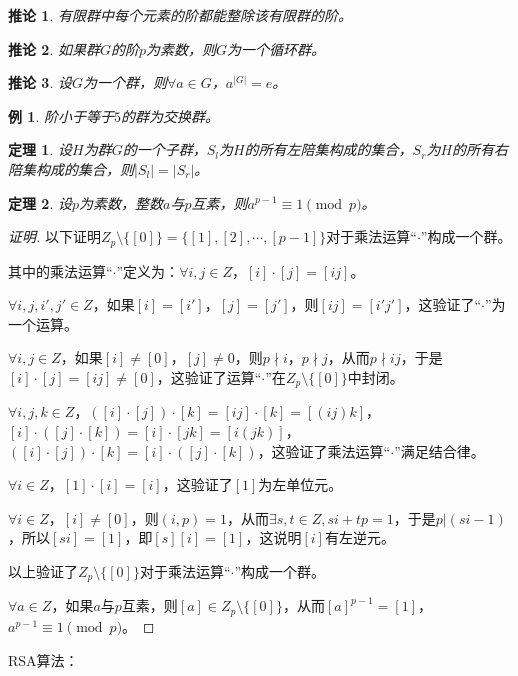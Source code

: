 \documentclass{article}
\newtheorem{Thm}{定理}
\newtheorem*{Example}{例}
\newtheorem{Cor}{推论}
\begin{document}
\begin{CJK*}{UTF8}{gbsn}
\begin{Cor}
有限群中每个元素的阶都能整除该有限群的阶。
\end{Cor}

\begin{Cor}
  如果群$G$的阶$p$为素数，则$G$为一个循环群。
\end{Cor}

\begin{Cor}
  设$G$为一个群，则$\forall a\in G$，$a^{|G|}=e$。
\end{Cor}

\begin{Example}
  阶小于等于$5$的群为交换群。
\end{Example}

\begin{Thm}
  设$H$为群$G$的一个子群，$S_l$为$H$的所有左陪集构成的集合，$S_r$为$H$的所有右陪集构成的集合，则$|S_l|=|S_r|$。
\end{Thm}

\begin{Thm}
  设$p$为素数，整数$a$与$p$互素，则$a^{p-1}\equiv 1 \pmod p$。
\end{Thm}
\begin{proof}[证明]
  以下证明$Z_p\setminus \{[0]\}=\{[1],[2],\cdots,[p-1]\}$对于乘法运算“$\cdot$”构成一个群。

  其中的乘法运算“$\cdot$”定义为：$\forall i,j\in Z$，$[i]\cdot [j]=[ij]$。

  $\forall i,j,i',j'\in Z$，如果$[i]=[i']$，$[j]=[j']$，则$[ij]=[i'j']$，这验证了“$\cdot$”为一个运算。

  $\forall i,j\in Z$，如果$[i]\neq [0]$，$[j]\neq 0$，则$p\nmid i$，$p\nmid j$，从而$p\nmid ij$，于是$[i]\cdot[j]=[ij]\neq [0]$，这验证了运算“$\cdot$”在$Z_p\setminus \{[0]\}$中封闭。

  $\forall i,j,k\in Z$，$([i]\cdot [j])\cdot [k]=[ij]\cdot [k]=[(ij)k]$，$[i]\cdot ([j]\cdot [k])=[i]\cdot [jk]=[i(jk)]$，$([i]\cdot [j])\cdot [k]=[i]\cdot ([j]\cdot [k])$，这验证了乘法运算“$\cdot$”满足结合律。

  $\forall i\in Z$，$[1]\cdot [i] =[i]$，这验证了$[1]$为左单位元。

  $\forall i\in Z$，$[i]\neq [0]$，则$(i,p)=1$，从而$\exists s,t\in Z,si+tp=1$，于是$p|(si-1)$，所以$[si]=[1]$，即$[s][i]=[1]$，这说明$[i]$有左逆元。

  以上验证了$Z_p\setminus \{[0]\}$对于乘法运算“$\cdot$”构成一个群。

  $\forall a\in Z$，如果$a$与$p$互素，则$[a]\in Z_p\setminus \{[0]\}$，从而$[a]^{p-1}=[1]$，$a^{p-1}\equiv 1 \pmod {p}$。
\end{proof}
RSA算法：


\end{CJK*}
\end{document}
